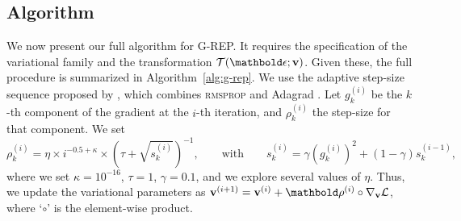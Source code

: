 

\vspace*{-5pt}
\subsection{Algorithm}
\vspace*{-5pt}
We now present our full algorithm for \gls{G-REP}. It requires the specification of the variational family and the transformation $\Tcal(\beps;\bv)$. Given these, the full procedure is summarized in Algorithm~\ref{alg:g-rep}.
%
We use the adaptive step-size sequence proposed by \citet{Kucukelbir2016}, which combines \textsc{rmsprop} \citep{Tieleman2012} and Adagrad \citep{Duchi2011}. Let $g_k^{(i)}$ be the $k$-th component of the gradient at the $i$-th iteration, and $\rho_k^{(i)}$ the step-size for that component. We set
\begin{equation}\label{eq:step_schedule}
  \rho_k^{(i)} = \eta \times i^{-0.5+\kappa}\times \left ( \tau + \sqrt{s_k^{(i)}} \right)^{-1},\qquad \textrm{with} \qquad s_k^{(i)} = \gamma (g_k^{(i)})^2 + (1-\gamma)s_k^{(i-1)},
\end{equation}
where we set $\kappa=10^{-16}$, $\tau=1$, $\gamma=0.1$, and we explore several values of $\eta$. Thus, we update the variational parameters as $\bv^{(i+1)} = \bv^{(i)} + \brho^{(i)}\circ\nabla_{\bv}\Lcal$, where `$\circ$' is the element-wise product.


